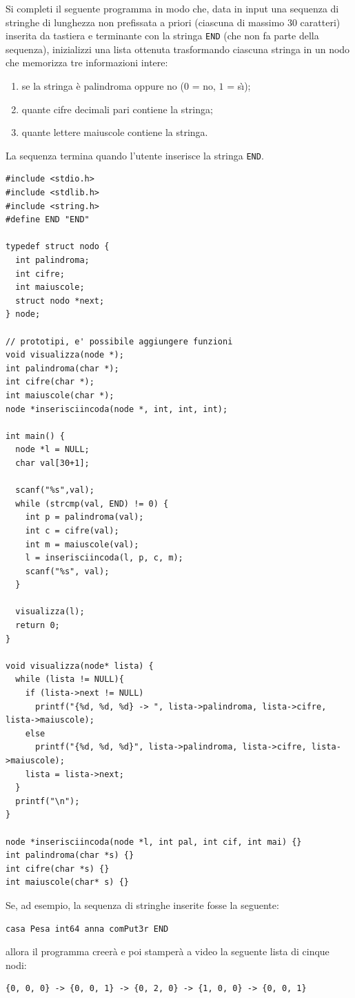 \documentclass[12pt]{article}
\begin{document}
Si completi il seguente programma in modo che, data in input una sequenza di stringhe
di lunghezza non prefissata a priori (ciascuna di massimo $30$ caratteri)
inserita da tastiera e terminante con la stringa \texttt{END}
(che non fa parte della sequenza),
inizializzi una lista ottenuta trasformando ciascuna stringa
in un nodo che memorizza tre informazioni intere:
%
\begin{enumerate}
\item se la stringa \`e palindroma oppure no
  ($0$ = no, $1$ = s\`{\i});
\item quante cifre decimali pari contiene la stringa;
\item quante lettere maiuscole contiene la stringa.
\end{enumerate}
%
La sequenza termina quando l'utente inserisce
la stringa \texttt{END}.

\begin{mdframed}[backgroundcolor=verylightgray]
  \begin{lstlisting}[language=myC]
#include <stdio.h>
#include <stdlib.h>
#include <string.h>
#define END "END"

typedef struct nodo {
  int palindroma;
  int cifre;
  int maiuscole;
  struct nodo *next;
} node;

// prototipi, e' possibile aggiungere funzioni
void visualizza(node *);
int palindroma(char *);
int cifre(char *);
int maiuscole(char *);
node *inserisciincoda(node *, int, int, int);

int main() {
  node *l = NULL;
  char val[30+1];

  scanf("%s",val);
  while (strcmp(val, END) != 0) {
    int p = palindroma(val);
    int c = cifre(val);
    int m = maiuscole(val);
    l = inserisciincoda(l, p, c, m);
    scanf("%s", val);
  }
	
  visualizza(l);
  return 0;
}

void visualizza(node* lista) {
  while (lista != NULL){
    if (lista->next != NULL)
      printf("{%d, %d, %d} -> ", lista->palindroma, lista->cifre, lista->maiuscole);
    else
      printf("{%d, %d, %d}", lista->palindroma, lista->cifre, lista->maiuscole);
    lista = lista->next;
  }
  printf("\n");
}

node *inserisciincoda(node *l, int pal, int cif, int mai) {}
int palindroma(char *s) {}
int cifre(char *s) {}
int maiuscole(char* s) {}
  \end{lstlisting}
\end{mdframed}

Se, ad esempio, la sequenza di stringhe inserite fosse la seguente:
%
\begin{mdframed}[backgroundcolor=verylightgray]
\begin{verbatim}
casa Pesa int64 anna comPut3r END
\end{verbatim}
\end{mdframed}
%
allora il programma creer\`a e poi stamper\`a a video la seguente lista di cinque nodi:
%
\begin{mdframed}[backgroundcolor=verylightgray]
\begin{verbatim}
{0, 0, 0} -> {0, 0, 1} -> {0, 2, 0} -> {1, 0, 0} -> {0, 0, 1}
\end{verbatim}
\end{mdframed}
\end{document}
